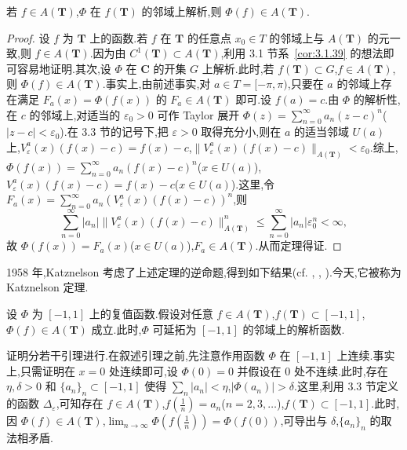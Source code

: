 \begin{theorem}\label{thm:3.5.2}
若 $f \in A(\mathbf{T})$,$\Phi$ 在 $f(\mathbf{T})$ 的邻域上解析,则 $\Phi(f) \in A(\mathbf{T})$.
\end{theorem}

\begin{proof}
设 $f$ 为 $\mathbf{T}$ 上的函数.若 $f$ 在 $\mathbf{T}$ 的任意点 $x_{0} \in T$ 的邻域上与 $A(\mathbf{T})$ 的元一致,则 $f \in A(\mathbf{T})$.因为由 $C^{1}(\mathbf{T}) \subset A(\mathbf{T})$,利用 3.1 节系~\ref{cor:3.1.39} 的想法即可容易地证明.其次,设 $\Phi$ 在 $\mathbf{C}$ 的开集 $G$ 上解析.此时,若 $f(\mathbf{T}) \subset G$,$f \in A(\mathbf{T})$,则 $\Phi(f) \in A(\mathbf{T})$.事实上,由前述事实,对 $a \in T = [-\pi, \pi)$,只要在 $a$ 的邻域上存在满足 $F_{a}(x) = \Phi(f(x))$ 的 $F_{a} \in A(\mathbf{T})$ 即可.设 $f(a) = c$.由 $\Phi$ 的解析性,在 $c$ 的邻域上,对适当的 $\varepsilon_{0} > 0$ 可作 Taylor 展开 $\Phi(z) = \sum_{n=0}^{\infty}a_{n}(z - c)^{n}$($|z - c| < \varepsilon_{0}$).在 3.3 节的记号下,把 $\varepsilon > 0$ 取得充分小,则在 $a$ 的适当邻域 $U(a)$ 上,$V_{\varepsilon}^{a}(x)(f(x) - c) = f(x) - c$,$\|V_{\varepsilon}^{a}(x)(f(x) - c)\|_{A(\mathbf{T})} < \varepsilon_{0}$.综上,$\Phi(f(x)) = \sum_{n=0}^{\infty}a_{n}(f(x) - c)^{n}$($x \in U(a)$),$V_{\varepsilon}^{a}(x)(f(x) - c) = f(x) - c$($x \in U(a)$).这里,令 $F_{a}(x) = \sum_{n=0}^{\infty}a_{n}(V_{\varepsilon}^{a}(x)(f(x) - c))^{n}$,则
\begin{equation*}
\sum_{n=0}^{\infty}|a_{n}|\|V_{\varepsilon}^{a}(x)(f(x) - c)\|_{A(\mathbf{T})}^{n} \leq \sum_{n=0}^{\infty}|a_{n}|\varepsilon_{0}^{n} < \infty,
\end{equation*}
故 $\Phi(f(x)) = F_{a}(x)$($x \in U(a)$),$F_{a} \in A(\mathbf{T})$.从而定理得证.
\end{proof}

1958 年,Katznelson \cite{ch3:31} 考虑了上述定理的逆命题,得到如下结果(cf. \cite{ch3:7}, \cite{ch3:8}, \cite{ch3:11}).今天,它被称为 Katznelson 定理.

\begin{theorem}[Katznelson]\label{thm:3.5.3}
设 $\Phi$ 为 $[-1, 1]$ 上的复值函数.假设对任意 $f \in A(\mathbf{T})$,$f(\mathbf{T}) \subset [-1, 1]$,$\Phi(f) \in A(\mathbf{T})$ 成立.此时,$\Phi$ 可延拓为 $[-1, 1]$ 的邻域上的解析函数.
\end{theorem}

证明分若干引理进行.在叙述引理之前,先注意作用函数 $\Phi$ 在 $[-1, 1]$ 上连续.事实上,只需证明在 $x = 0$ 处连续即可,设 $\Phi(0) = 0$ 并假设在 0 处不连续.此时,存在 $\eta, \delta > 0$ 和 $\{a_{n}\}_{n} \subset [-1, 1]$ 使得 $\sum_{n}|a_{n}| < \eta$,$|\Phi(a_{n})| > \delta$.这里,利用 3.3 节定义的函数 $\Delta_{\varepsilon}$,可知存在 $f \in A(\mathbf{T})$,$f(\frac{1}{n}) = a_{n}$($n = 2, 3, \ldots$),$f(\mathbf{T}) \subset [-1, 1]$.此时,因 $\Phi(f) \in A(\mathbf{T})$,$\lim_{n \to \infty}\Phi(f(\frac{1}{n})) = \Phi(f(0))$,可导出与 $\delta$,$\{a_{n}\}_{n}$ 的取法相矛盾.


